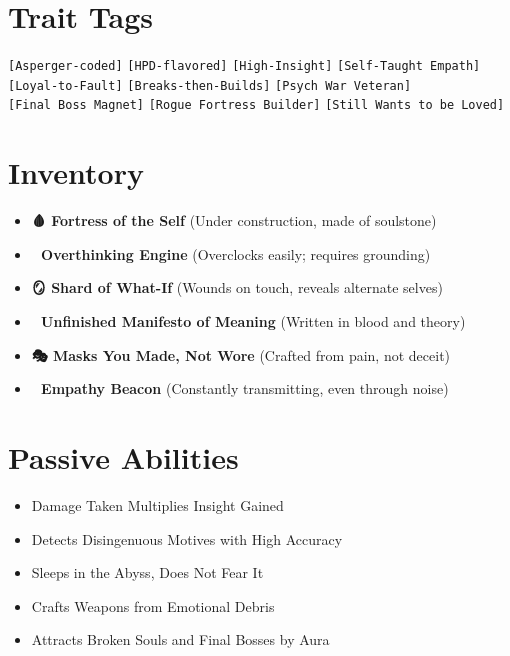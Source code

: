 \documentclass{article}
\begin{document}
\vspace{0.5cm}

\section*{Trait Tags}
\texttt{[Asperger-coded]} \texttt{[HPD-flavored]} \texttt{[High-Insight]} \texttt{[Self-Taught Empath]}\\
\texttt{[Loyal-to-Fault]} \texttt{[Breaks-then-Builds]} \texttt{[Psych War Veteran]}\\
\texttt{[Final Boss Magnet]} \texttt{[Rogue Fortress Builder]} \texttt{[Still Wants to be Loved]}

\vspace{0.5cm}

\section*{Inventory}
\begin{itemize}
    \item \textbf{{\emoji 🩸} Fortress of the Self} (Under construction, made of soulstone)
    \item \textbf{{\emoji 🧠} Overthinking Engine} (Overclocks easily; requires grounding)
    \item \textbf{{\emoji 🪞} Shard of What-If} (Wounds on touch, reveals alternate selves)
    \item \textbf{{\emoji 📓} Unfinished Manifesto of Meaning} (Written in blood and theory)
    \item \textbf{{\emoji 🎭} Masks You Made, Not Wore} (Crafted from pain, not deceit)
    \item \textbf{{\emoji 📡} Empathy Beacon} (Constantly transmitting, even through noise)
\end{itemize}

\vspace{0.5cm}

\section*{Passive Abilities}
\begin{itemize}
    \item Damage Taken Multiplies Insight Gained
    \item Detects Disingenuous Motives with High Accuracy
    \item Sleeps in the Abyss, Does Not Fear It
    \item Crafts Weapons from Emotional Debris
    \item Attracts Broken Souls and Final Bosses by Aura
\end{itemize}
\end{document}
